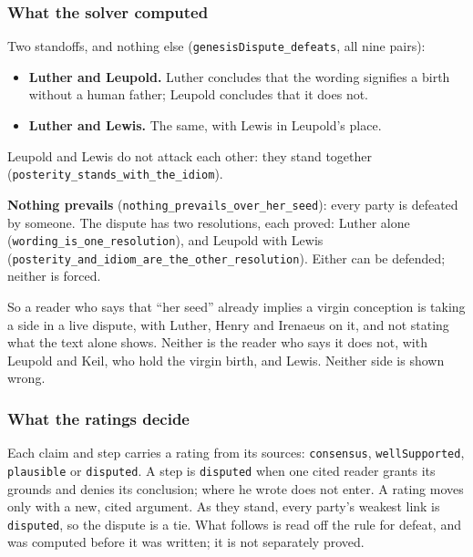 \documentclass[11pt]{article}
\begin{document}
\subsubsection*{What the solver computed}
Two standoffs, and nothing else (\texttt{genesis\allowbreak{}Dispute\_\allowbreak{}defeats}, all nine pairs):

\begin{itemize}
  \item \textbf{Luther and Leupold.} Luther concludes that the wording signifies a birth without a human father; Leupold concludes that it does not.
  \item \textbf{Luther and Lewis.} The same, with Lewis in Leupold’s place.
\end{itemize}
Leupold and Lewis do not attack each other: they stand together (\texttt{posterity\_\allowbreak{}stands\_\allowbreak{}with\_\allowbreak{}the\_\allowbreak{}idiom}).

\textbf{Nothing prevails} (\texttt{nothing\_\allowbreak{}prevails\_\allowbreak{}over\_\allowbreak{}her\_\allowbreak{}seed}): every party is defeated by someone. The dispute has two resolutions, each proved: Luther alone (\texttt{wording\_\allowbreak{}is\_\allowbreak{}one\_\allowbreak{}resolution}), and Leupold with Lewis (\texttt{posterity\_\allowbreak{}and\_\allowbreak{}idiom\_\allowbreak{}are\_\allowbreak{}the\_\allowbreak{}other\_\allowbreak{}resolution}). Either can be defended; neither is forced.

So a reader who says that “her seed” already implies a virgin conception is taking a side in a live dispute, with Luther, Henry and Irenaeus on it, and not stating what the text alone shows. Neither is the reader who says it does not, with Leupold and Keil, who hold the virgin birth, and Lewis. Neither side is shown wrong.

\subsubsection*{What the ratings decide}
Each claim and step carries a rating from its sources: \texttt{consensus}, \texttt{well\allowbreak{}Supported}, \texttt{plausible} or \texttt{disputed}. A step is \texttt{disputed} when one cited reader grants its grounds and denies its conclusion; where he wrote does not enter. A rating moves only with a new, cited argument. As they stand, every party’s weakest link is \texttt{disputed}, so the dispute is a tie. What follows is read off the rule for defeat, and was computed before it was written; it is not separately proved.
\end{document}
